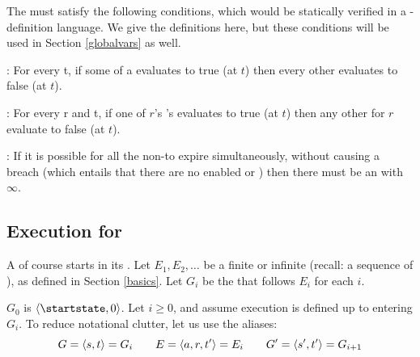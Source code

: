 \documentclass[12pt]{article}
\begin{document}
The \TGuards must satisfy the following conditions, which would be statically verified in a \Contract-definition language. We give the \FSContracts definitions here, but these conditions will be used in Section \ref{globalvars} as well.
\medskip

\noindent {}: For every \TimeStamp t, if some \TGuard of a \mustnarule evaluates to true (at $t$) then every other \TGuard evaluates to false (at $t$).
\medskip

\noindent {}: For every \Role r and \TimeStamp t, if one of $r$'s \rmustnarules's \TGuards evaluates to true (at $t$) then any other \rmustnarules for $r$ evaluate to false (at $t$).
\medskip

\noindent {}: If it is possible for all the \enabled non-\Env \actionrules to expire simultaneously, without causing a breach (which entails that there are no enabled \mustnarules or \rmustnarules) then there must be an \envarule with \Deadline $\infty$.
\smallskip



%


\subsection{Execution for \FSContracts} \label{fscontractexec}
A \FSContract of course starts in its \startstate. Let $E_1, E_2, \dots$ be a finite or infinite \trace (recall: a sequence of \Events), as defined in Section \ref{basics}. Let $G_i$ be the \GlobalState that follows $E_i$ for each $i$.

$G_0$ is $\tup{\startstate, 0}$.
Let $i \geq 0$, and assume execution is defined up to entering $G_i$. To reduce notational clutter, let us use the aliases:
\[ G = \langle s,t\rangle = G_i  \qquad E = \langle a,r,t'\rangle = E_i \qquad  G' = \langle s',t'\rangle = G_{i+1}\]
\end{document}
